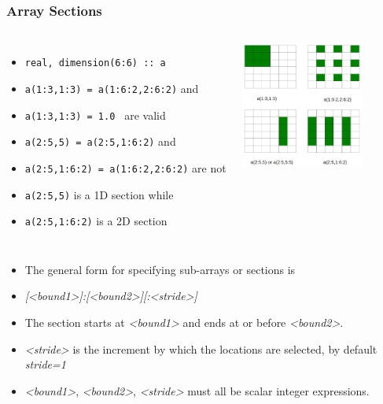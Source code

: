\documentclass[c,mathserif,compress,xcolor=svgnames]{beamer}
\newcommand{\lstfortran}[1]{\lstinline[language={[90]Fortran},basicstyle=\footnotesize\ttfamily]|#1|}
\begin{document}
\begin{frame}
  \frametitle{\small Array Sections}
  \begin{columns}[t]
    \column{7cm}
    \begin{itemize}
      \scriptsize
      \item[] \lstfortran{real, dimension(6:6) :: a}
      \item {\lstfortran{a(1:3,1:3) = a(1:6:2,2:6:2)}} and
      \item[] {\lstfortran{a(1:3,1:3) = 1.0 }} are valid
      \item {\lstfortran{a(2:5,5) = a(2:5,1:6:2)}} and
      \item[] {\lstfortran{a(2:5,1:6:2) = a(1:6:2,2:6:2)}} are not
      \item {\lstfortran{a(2:5,5)}} is a 1D section while 
      \item[] {\lstfortran{a(2:5,1:6:2)}} is a 2D section
    \end{itemize}
    \column{4cm}
    \begin{center}
      \includegraphics[width=4cm,clip=true]{./graphics/array6}
    \end{center}
  \end{columns}
  \begin{itemize}
    \scriptsize
    \item The general form for specifying sub-arrays or sections is
    \item[] \textit{[<bound1>]:[<bound2>][:<stride>]}
    \item The section starts at \textit{<bound1>} and ends at or before \textit{<bound2>}.
    \item \textit{<stride>} is the increment by which the locations are selected, by default \textit{stride=1}
    \item \textit{<bound1>}, \textit{<bound2>}, \textit{<stride>} must all be scalar integer expressions.
  \end{itemize}


\end{frame}
\end{document}
